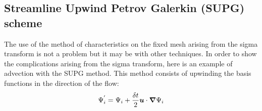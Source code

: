 %
%
%
%
%
%
%


\subsection{\label{sec:SUPG}Streamline Upwind Petrov Galerkin (SUPG) scheme}

The use of the method of characteristics on the fixed mesh arising from the sigma
transform is not a problem but it may be with other techniques. In order to
show the complications arising from the sigma transform, here is an example of
advection with the SUPG method. This method
consists of upwinding the basis functions in the direction of the flow:%
\begin{equation}
\Psi_{i}^{^{\prime}}=\Psi_{i}+\dfrac{\delta t}{2}\bm{u}\cdot\bm{\nabla} \Psi_{i}
\end{equation}

